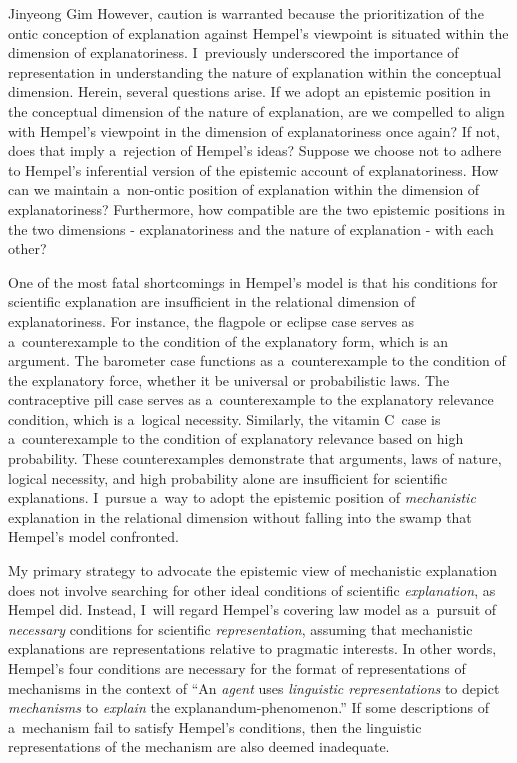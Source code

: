 \begin{artengenv}{Jinyeong Gim}
However, caution is warranted because the prioritization of the ontic conception of explanation against Hempel's viewpoint is situated within the dimension of explanatoriness. I~previously underscored the importance of representation in understanding the nature of explanation within the conceptual dimension. Herein, several questions arise. If we adopt an epistemic position in the conceptual dimension of the nature of explanation, are we compelled to align with Hempel's viewpoint in the dimension of explanatoriness once again? If not, does that imply a~rejection of Hempel's ideas? Suppose we choose not to adhere to Hempel's inferential version of the epistemic account of explanatoriness. How can we maintain a~non-ontic position of explanation within the dimension of explanatoriness? Furthermore, how compatible are the two epistemic positions in the two dimensions - explanatoriness and the nature of explanation - with each other?

One of the most fatal shortcomings in Hempel's model is that his conditions for scientific explanation are insufficient in the relational dimension of explanatoriness. For instance, the flagpole or eclipse case serves as a~counterexample to the condition of the explanatory form, which is an argument. The barometer case functions as a~counterexample to the condition of the explanatory force, whether it be universal or probabilistic laws. The contraceptive pill case serves as a~counterexample to the explanatory relevance condition, which is a~logical necessity. Similarly, the vitamin C~case is a~counterexample to the condition of explanatory relevance based on high probability. These counterexamples demonstrate that arguments, laws of nature, logical necessity, and high probability alone are insufficient for scientific explanations. I~pursue a~way to adopt the epistemic position of \textit{mechanistic} explanation in the relational dimension without falling into the swamp that Hempel's model confronted.

My primary strategy to advocate the epistemic view of mechanistic explanation does not involve searching for other ideal conditions of scientific \textit{explanation}, as Hempel did. Instead, I~will regard Hempel's covering law model as a~pursuit of \textit{necessary} conditions for scientific \textit{representation}, assuming that mechanistic explanations are representations relative to pragmatic interests. In other words, Hempel's four conditions are necessary for the format of representations of mechanisms in the context of ``An \textit{agent} uses \textit{linguistic representations} to depict \textit{mechanisms} to \textit{explain} the explanandum-phenomenon.'' If some descriptions of a~mechanism fail to satisfy Hempel's conditions, then the linguistic representations of the mechanism are also deemed inadequate.


\end{artengenv}
